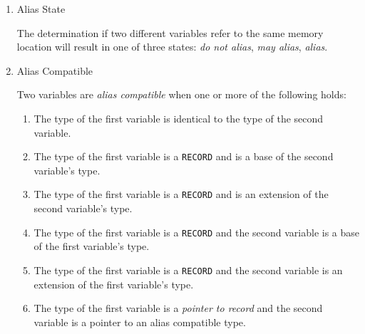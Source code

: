 \begin{enumerate}
  \item Alias State

    The determination if two different variables refer to the same
    memory location will result in one of three states: \emph{do not
      alias}, \emph{may alias}, \emph{alias}.


  \item Alias Compatible

    Two variables are \emph{alias compatible} when one or more of the
    following holds:

    \begin{enumerate}
      \item The type of the first variable is identical to the type of
        the second variable.

      \item The type of the first variable is a \texttt{RECORD} and is
        a base of the second variable's type.

      \item The type of the first variable is a \texttt{RECORD} and is
        an extension of the second variable's type.

      \item The type of the first variable is a \texttt{RECORD} and
        the second variable is a base of the first variable's type.

      \item The type of the first variable is a \texttt{RECORD} and
        the second variable is an extension of the first variable's
        type.

      \item The type of the first variable is a \emph{pointer to
        record} and the second variable is a pointer to an alias
        compatible type.

    \end{enumerate}

\end{enumerate}

